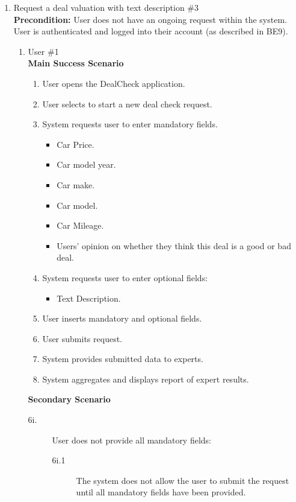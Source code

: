 \documentclass[]{article}
\begin{document}
\begin{enumerate}[{\bf {BE}1.}]
\item Request a deal valuation with text description \#3 \\
    {\bf Precondition:} User does not have an ongoing request within the system. User is authenticated and logged into their account (as described in BE9).
    \begin{enumerate}[{\bf VP1.}]
        \item User \#1 \\
        {\bf Main Success Scenario}
        \begin{enumerate}[1.]
            \item User opens the DealCheck application.
            \item User selects to start a new deal check request.
            \item System requests user to enter mandatory fields.
            \begin{itemize}
                \item Car Price.
                \item Car model year.
                \item Car make.
                \item Car model.
                \item Car Mileage.
                \item Users' opinion on whether they think this deal is a good or bad deal.
            \end{itemize}
            \item System requests user to enter optional fields:
            \begin{itemize}
                \item Text Description.
            \end{itemize}
            \item User inserts mandatory and optional fields.
            \item User submits request.
            \item System provides submitted data to experts.
            \item System aggregates and displays report of expert results.
        \end{enumerate}
        
        {\bf Secondary Scenario} \\
		\begin{description}
			\item [6i.] User does not provide all mandatory fields:
			\begin{description}
				\item [6i.1] The system does not allow the user to submit the request until all mandatory fields have been provided.
			\end{description}
		

\end{description}
\end{enumerate}
\end{enumerate}
\end{document}
